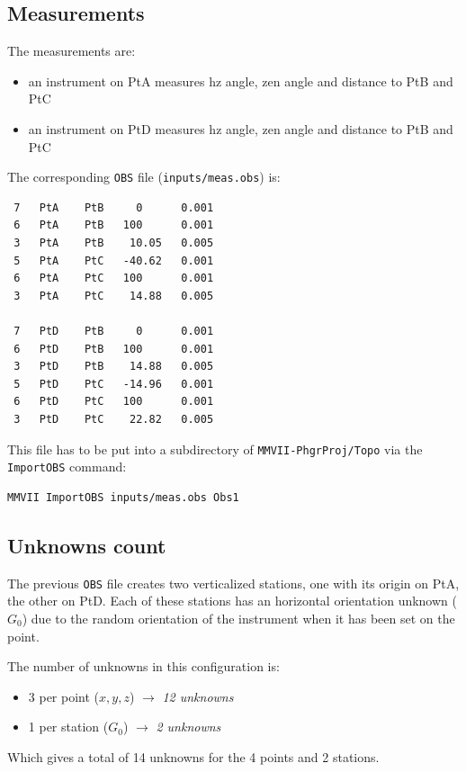 \subsection{Measurements}
The measurements are:
\begin{itemize}
   \item an instrument on PtA measures hz angle, zen angle and distance to PtB and PtC
   \item an instrument on PtD measures hz angle, zen angle and distance to PtB and PtC
\end{itemize}
The corresponding \texttt{OBS} file (\texttt{inputs/meas.obs}) is:
\begin{verbatim}
 7   PtA    PtB     0      0.001
 6   PtA    PtB   100      0.001
 3   PtA    PtB    10.05   0.005
 5   PtA    PtC   -40.62   0.001
 6   PtA    PtC   100      0.001
 3   PtA    PtC    14.88   0.005

 7   PtD    PtB     0      0.001
 6   PtD    PtB   100      0.001
 3   PtD    PtB    14.88   0.005
 5   PtD    PtC   -14.96   0.001
 6   PtD    PtC   100      0.001
 3   PtD    PtC    22.82   0.005
\end{verbatim}
This file has to be put into a subdirectory of \texttt{MMVII-PhgrProj/Topo} via the \texttt{ImportOBS} command:
\begin{lstlisting}
MMVII ImportOBS inputs/meas.obs Obs1
\end{lstlisting}


\subsection{Unknowns count}

The previous \texttt{OBS} file creates two verticalized stations, one with its origin on PtA, the other on PtD.
Each of these stations has an horizontal orientation unknown ($G_0$) due to the random orientation of the instrument
when it has been set on the point.

The number of unknowns in this configuration is:
\begin{itemize}
   \item 3 per point ($x, y, z$)  $\rightarrow$ \textit{12 unknowns}
   \item 1 per station ($G_0$)  $\rightarrow$ \textit{2 unknowns}
\end{itemize}

Which gives a total of 14 unknowns for the 4 points and 2 stations.
\\

